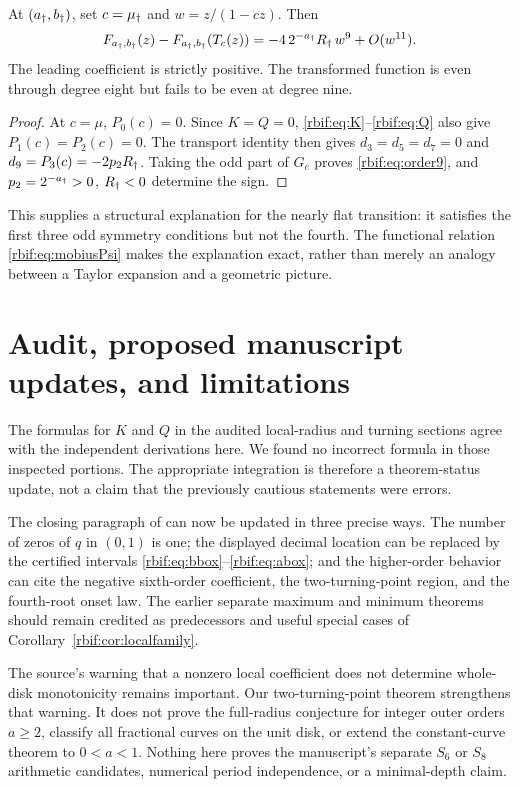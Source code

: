 \begin{corollary}
\label{rbif:cor:order9}
At $(a_\dagger,b_\dagger)$, set $c=\mu_\dagger$ and $w=z/(1-cz)$. Then
\begin{equation}
 F_{a_\dagger,b_\dagger}(z)-F_{a_\dagger,b_\dagger}(T_c(z))
 =-4\,2^{-a_\dagger}R_\dagger\,w^9+O(w^{11}).
 \label{rbif:eq:order9}
\end{equation}
The leading coefficient is strictly positive. The transformed function
is even through degree eight but fails to be even at degree nine.
\end{corollary}
\begin{proof}
At $c=\mu$, $P_0(c)=0$. Since $K=Q=0$,
\eqref{rbif:eq:K}--\eqref{rbif:eq:Q} also give $P_1(c)=P_2(c)=0$.
The transport identity then gives $d_3=d_5=d_7=0$ and
$d_9=P_3(c)=-2p_2R_\dagger$.
Taking the odd part of $G_c$ proves \eqref{rbif:eq:order9}, and
$p_2=2^{-a_\dagger}>0$, $R_\dagger<0$ determine the sign.
\end{proof}

This supplies a structural explanation for the nearly flat transition:
it satisfies the first three odd symmetry conditions but not the fourth.
The functional relation \eqref{rbif:eq:mobiusPsi} makes the explanation
exact, rather than merely an analogy between a Taylor expansion and a
geometric picture.

\section{Audit, proposed manuscript updates, and limitations}
\label{rbif:sec:audit}
The formulas for $K$ and $Q$ in the audited local-radius and turning
sections agree with the independent derivations here. We found no
incorrect formula in those inspected portions. The appropriate
integration is therefore a theorem-status update, not a claim that the
previously cautious statements were errors.

The closing paragraph of  can now be updated
in three precise ways. The number of zeros of $q$ in $(0,1)$ is one;
the displayed decimal location can be replaced by the certified intervals
\eqref{rbif:eq:bbox}--\eqref{rbif:eq:abox}; and the higher-order behavior
can cite the negative sixth-order coefficient, the two-turning-point
region, and the fourth-root onset law. The earlier separate maximum and
minimum theorems should remain credited as predecessors and useful
special cases of Corollary~\ref{rbif:cor:localfamily}.

The source's warning that a nonzero local coefficient does not determine
whole-disk monotonicity remains important. Our two-turning-point theorem
strengthens that warning. It does not prove the full-radius conjecture
for integer outer orders $a\ge2$, classify all fractional curves on the
unit disk, or extend the constant-curve theorem to $0<a<1$.
Nothing here proves the manuscript's separate $S_6$ or $S_8$ arithmetic
candidates, numerical period independence, or a minimal-depth claim.

